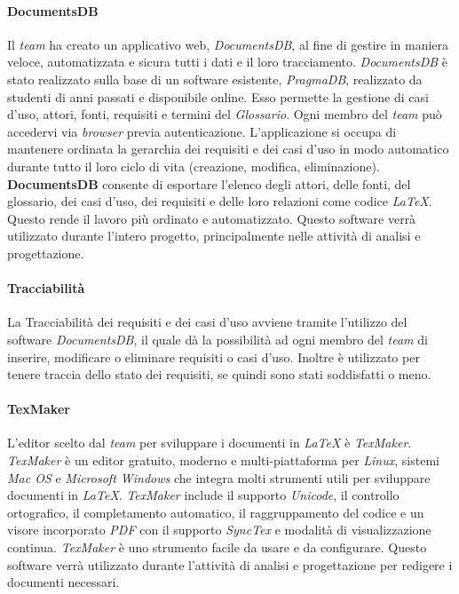 \paragraph{DocumentsDB}
Il \textit{team} ha creato un applicativo web, \textit{DocumentsDB}, al fine di gestire in maniera veloce, automatizzata
e sicura tutti i dati e il loro tracciamento. \textit{DocumentsDB} è stato realizzato sulla base di un software esistente, \textit{PragmaDB}, realizzato da
studenti di anni passati e disponibile online. Esso permette la gestione di casi d'uso, attori, fonti, requisiti e termini del \textit{Glossario}.
Ogni membro del \textit{team} può accedervi via \textit{browser} previa autenticazione.
L'applicazione si occupa di mantenere ordinata la gerarchia dei requisiti e dei casi d'uso in modo automatico durante tutto il loro ciclo di vita (creazione, modifica, eliminazione).
\textbf{DocumentsDB} consente di esportare l'elenco degli attori, delle fonti, del glossario, dei casi d'uso, dei requisiti e delle loro relazioni come codice \textit{\LaTeX{}}.
Questo rende il lavoro più ordinato e automatizzato. Questo software verrà utilizzato durante l'intero progetto, principalmente nelle attività di analisi e progettazione.

\paragraph{Tracciabilità}
La Tracciabilità dei requisiti e dei casi d'uso avviene tramite l'utilizzo del software \textit{DocumentsDB}, il quale dà la possibilità ad ogni membro del \textit{team} di inserire, modificare o eliminare requisiti o casi d'uso.
Inoltre è utilizzato per tenere traccia dello stato dei requisiti, se quindi sono stati soddisfatti o meno.

\paragraph{TexMaker}
L'editor scelto dal \textit{team} per sviluppare i documenti in \textit{\LaTeX{}} è \textit{TexMaker}.
\textit{TexMaker} è un editor gratuito, moderno e multi-piattaforma per \textit{Linux}, sistemi \textit{Mac OS} e \textit{Microsoft Windows} che integra molti strumenti utili per sviluppare documenti in \textit{\LaTeX{}}.
\textit{TexMaker} include il supporto \textit{Unicode}, il controllo ortografico, il completamento automatico, il raggruppamento del codice e un visore incorporato \textit{PDF} con il supporto \textit{SyncTex} e modalità di visualizzazione continua.
\textit{TexMaker} è uno strumento facile da usare e da configurare. Questo software verrà utilizzato durante l'attività di analisi e progettazione per redigere i documenti necessari.

